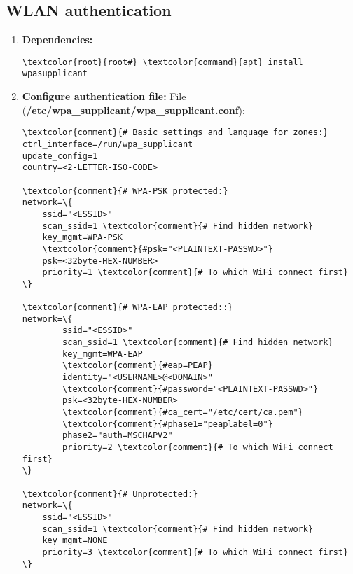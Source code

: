 \documentclass[10pt, a4paper, onecolumn, openany]{book} %
\begin{document}
\subsection{WLAN authentication}
\begin{enumerate}
    \item \textbf{Dependencies:}
\begin{Verbatim}[commandchars=\\\{\}]
\textcolor{root}{root#} \textcolor{command}{apt} install wpasupplicant
\end{Verbatim}
    \item \textbf{Configure authentication file:}
\newline File (\textbf{\textcolor{file}{/etc/wpa\_supplicant/wpa\_supplicant.conf}}):
\begin{Verbatim}[commandchars=\\\{\}]
\textcolor{comment}{# Basic settings and language for zones:}
ctrl_interface=/run/wpa_supplicant
update_config=1
country=<2-LETTER-ISO-CODE>

\textcolor{comment}{# WPA-PSK protected:}
network=\{
    ssid="<ESSID>"
    scan_ssid=1 \textcolor{comment}{# Find hidden network}
    key_mgmt=WPA-PSK
    \textcolor{comment}{#psk="<PLAINTEXT-PASSWD>"}
    psk=<32byte-HEX-NUMBER>
    priority=1 \textcolor{comment}{# To which WiFi connect first}
\}

\textcolor{comment}{# WPA-EAP protected::}
network=\{
        ssid="<ESSID>"
        scan_ssid=1 \textcolor{comment}{# Find hidden network}
        key_mgmt=WPA-EAP
        \textcolor{comment}{#eap=PEAP}
        identity="<USERNAME>@<DOMAIN>"
        \textcolor{comment}{#password="<PLAINTEXT-PASSWD>"}
        psk=<32byte-HEX-NUMBER>
        \textcolor{comment}{#ca_cert="/etc/cert/ca.pem"}
        \textcolor{comment}{#phase1="peaplabel=0"}
        phase2="auth=MSCHAPV2"
        priority=2 \textcolor{comment}{# To which WiFi connect first}
\}

\textcolor{comment}{# Unprotected:}
network=\{
    ssid="<ESSID>"
    scan_ssid=1 \textcolor{comment}{# Find hidden network}
    key_mgmt=NONE
    priority=3 \textcolor{comment}{# To which WiFi connect first}
\}
\end{Verbatim}
\end{enumerate}
\end{document}
